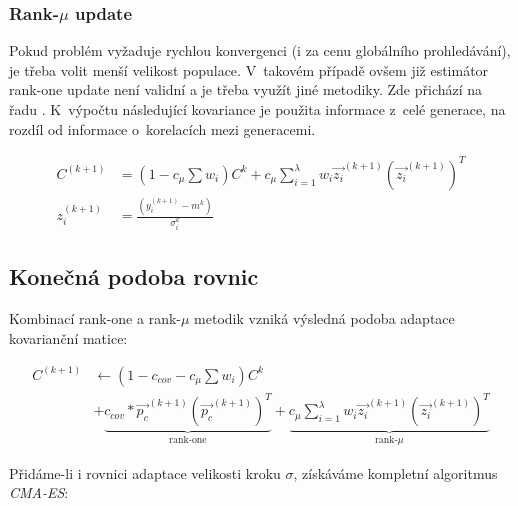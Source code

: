 \subsubsection{Rank-$\mu$ update}
Pokud problém vyžaduje rychlou konvergenci (i za cenu globálního prohledávání), je třeba volit menší velikost populace. V~takovém případě ovšem již estimátor rank-one update není validní a je třeba využít jiné metodiky. Zde přichází na řadu . K~výpočtu následující kovariance je použita informace z~celé generace, na rozdíl od informace o~korelacích mezi generacemi.
\begin{subequation}
    \label{eq:rankMuC}
    \begin{align}
        C^{(k+1)} &= (1-c_{\mu}\sum w_i)C^k + c_{\mu}\sum_{i=1}^{\lambda}w_i \Vec{z_{i}}^{(k+1)}({\Vec{z_{i}}^{(k+1)}})^T \\
        z_{i}^{(k+1)} &= \frac{(y_{i}^{(k+1)} - m^k)}{\sigma_{i}^{k}}
    \end{align}
\end{subequation}

\subsection{Konečná podoba rovnic}
Kombinací rank-one a rank-$\mu$ metodik vzniká výsledná podoba adaptace kovarianční matice:
\begin{subequation}
    \label{eq:cmaes_rankMuC}
    \begin{align}
        C^{(k+1)} &\leftarrow (1-c_{cov}-c_{\mu}\sum w_i)C^k \nonumber \\ 
                &+ \underbrace{c_{cov}*\Vec{p_c}^{(k+1)}(\Vec{p_c}^{(k+1)})^T }_\text{rank-one} + \underbrace{c_{\mu}\sum_{i=1}^{\lambda}w_i \Vec{z_{i}}^{(k+1)}({\Vec{z_{i}}^{(k+1)}})^T}_\text{rank-$\mu$}
    \end{align}
\end{subequation}


\pagebreak
\noindent Přidáme-li i rovnici adaptace velikosti kroku $\sigma$, získáváme kompletní algoritmus \emph{CMA-ES}:

